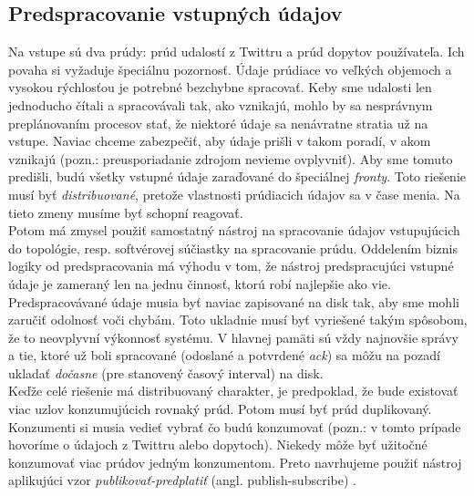 \subsection{Predspracovanie vstupných údajov}
Na vstupe sú dva prúdy: prúd udalostí z Twittru a prúd dopytov používateľa. Ich povaha si vyžaduje špeciálnu pozornosť. Údaje prúdiace vo veľkých objemoch a vysokou rýchlosťou je potrebné bezchybne spracovať. Keby sme udalosti len jednoducho čítali a spracovávali tak, ako vznikajú, mohlo by sa nesprávnym preplánovaním procesov stať, že niektoré údaje sa nenávratne stratia už na vstupe. Naviac chceme zabezpečiť, aby údaje prišli v takom poradí, v akom vznikajú (pozn.: preusporiadanie zdrojom nevieme ovplyvniť). 
Aby sme tomuto predišli, budú všetky vstupné údaje zaraďované do špeciálnej \textit{fronty}. Toto riešenie musí byť \textit{distribuované}, pretože vlastnosti prúdiacich údajov sa v čase menia. Na tieto zmeny musíme byť schopní reagovať. 
\\[5pt]
Potom má zmysel použiť samostatný nástroj na spracovanie údajov vstupujúcich do topológie, resp. softvérovej súčiastky na spracovanie prúdu. Oddelením biznis logiky od predspracovania má výhodu v tom, že nástroj predspracujúci vstupné údaje je zameraný len na jednu činnosť, ktorú robí najlepšie ako vie. Predspracovávané údaje musia byť naviac zapisované na disk tak, aby sme mohli zaručiť odolnosť voči chybám. Toto ukladnie musí byť vyriešené takým spôsobom, že to neovplyvní výkonnosť systému. V hlavnej pamäti sú vždy najnovšie správy a tie, ktoré už boli spracované (odoslané a potvrdené \textit{ack}) sa môžu na pozadí ukladať \textit{dočasne} (pre stanovený časový interval) na disk. 
\\[5pt]
Keďže celé riešenie má distribuovaný charakter, je predpoklad, že bude existovať viac uzlov konzumujúcich rovnaký prúd. Potom musí byť prúd duplikovaný. Konzumenti si musia vedieť vybrať čo budú konzumovať (pozn.: v tomto prípade hovoríme o údajoch z Twittru alebo dopytoch). Niekedy môže byť užitočné konzumovať viac prúdov jedným konzumentom. Preto navrhujeme použiť nástroj aplikujúci vzor \textit{publikovať-predplatiť} (angl. publish-subscribe) \citep{kreps2011kafka}. 

